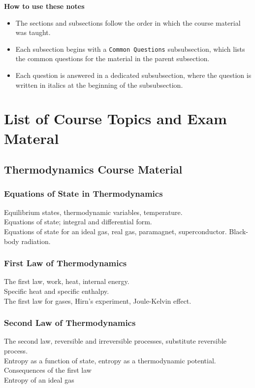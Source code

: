 \documentclass[11pt, a4paper]{article}
\begin{document}
\vspace{5mm}
\textbf{How to use these notes}
\begin{itemize}
    \item The sections and subsections follow the order in which the course material was taught.

    \item Each subsection begins with a \texttt{Common Questions} subsubsection, which lists the common questions for the material in the parent subsection.

    \item  Each question is answered in a dedicated subsubsection, where the question is written in italics at the beginning of the subsubsection.
\end{itemize}

\newpage

\tableofcontents	


\iffalse
\section{List of Course Topics and Exam Materal}
\subsection{Thermodynamics Course Material}
\subsubsection{Equations of State in Thermodynamics}
Equilibrium states, thermodynamic variables, temperature.\\
Equations of state; integral and differential form.\\
Equations of state for an ideal gas, real gas, paramagnet, superconductor. Black-body radiation.

\subsubsection{First Law of Thermodynamics}
The first law, work, heat, internal energy. \\
Specific heat and specific enthalpy.\\
The first law for gases, Hirn's experiment, Joule-Kelvin effect.

\subsubsection{Second Law of Thermodynamics}
The second law, reversible and irreversible processes, substitute reversible process.\\ Entropy as a function of state, entropy as a thermodynamic potential. \\
Consequences of the first law\\
Entropy of an ideal gas
\end{document}
